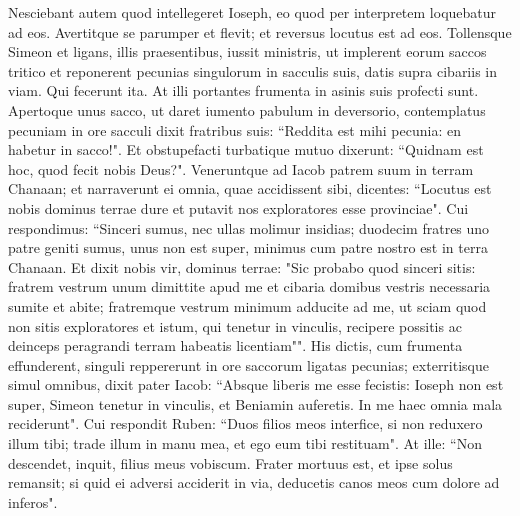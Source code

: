 \begin{biblechapter}
\verse Nesciebant autem quod intellegeret Ioseph, eo quod per interpretem loquebatur ad eos. 
\verse Avertitque se parumper et flevit; et reversus locutus est ad eos.  
\verse Tollensque Simeon et ligans, illis praesentibus, iussit ministris, ut implerent eorum saccos tritico et reponerent pecunias singulorum in sacculis suis, datis supra cibariis in viam. Qui fecerunt ita. 
\verse At illi portantes frumenta in asinis suis profecti sunt. 
\verse Apertoque unus sacco, ut daret iumento pabulum in deversorio, contemplatus pecuniam in ore sacculi 
\verse dixit fratribus suis: “Reddita est mihi pecunia: en habetur in sacco!". Et obstupefacti turbatique mutuo dixerunt: “Quidnam est hoc, quod fecit nobis Deus?". 
\verse Veneruntque ad Iacob patrem suum in terram Chanaan; et narraverunt ei omnia, quae accidissent sibi, dicentes: 
\verse “Locutus est nobis dominus terrae dure et putavit nos exploratores esse provinciae". 
\verse Cui respondimus: “Sinceri sumus, nec ullas molimur insidias; 
\verse duodecim fratres uno patre geniti sumus, unus non est super, minimus cum patre nostro est in terra Chanaan. 
\verse Et dixit nobis vir, dominus terrae: "Sic probabo quod sinceri sitis: fratrem vestrum unum dimittite apud me et cibaria domibus vestris necessaria sumite et abite; 
\verse fratremque vestrum minimum adducite ad me, ut sciam quod non sitis exploratores et istum, qui tenetur in vinculis, recipere possitis ac deinceps peragrandi terram habeatis licentiam"". 
\verse His dictis, cum frumenta effunderent, singuli reppererunt in ore saccorum ligatas pecunias; exterritisque simul omnibus, 
\verse dixit pater Iacob: “Absque liberis me esse fecistis: Ioseph non est super, Simeon tenetur in vinculis, et Beniamin auferetis. In me haec omnia mala reciderunt". 
\verse Cui respondit Ruben: “Duos filios meos interfice, si non reduxero illum tibi; trade illum in manu mea, et ego eum tibi restituam". 
\verse At ille: “Non descendet, inquit, filius meus vobiscum. Frater mortuus est, et ipse solus remansit; si quid ei adversi acciderit in via, deducetis canos meos cum dolore ad inferos". 
\end{biblechapter}

